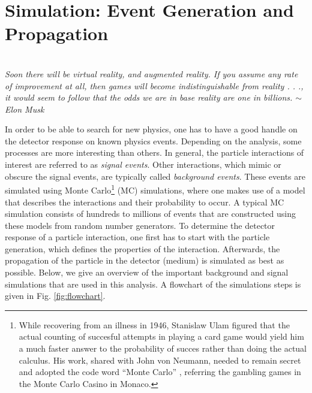 \chapter{Simulation: Event Generation and Propagation}
\label{ch:simulation}
\begin{flushright}
\textit{\\Soon there will be virtual reality, and augmented reality. If you assume any rate of improvement at all, then games will become indistinguishable from reality . . ., it would seem to follow that the odds we are in base reality are one in billions. $\sim$ Elon Musk\\}
\end{flushright}
In order to be able to search for new physics, one has to have a good handle on the detector response on known physics events. Depending on the analysis, some processes are more interesting than others. In general, the particle interactions of interest are referred to as \textit{signal events}. Other interactions, which mimic or obscure the signal events, are typically called \textit{background events}. These events are simulated using Monte Carlo\footnote{While recovering from an illness in 1946, Stanislaw Ulam figured that the actual counting of succesful attempts in playing a card game would yield him a much faster answer to the probability of succes rather than doing the actual calculus. His work, shared with John von Neumann, needed to remain secret and adopted the code word ``Monte Carlo'' , referring the gambling games in the Monte Carlo Casino in Monaco.} (MC) simulations, where one makes use of a model that describes the interactions and their probability to occur. A typical MC simulation consists of hundreds to millions of events that are constructed using these models from random number generators. To determine the detector response of a particle interaction, one first has to start with the particle generation, which defines the properties of the interaction. Afterwards, the propagation of the particle in the detector (medium) is simulated as best as possible. Below, we give an overview of the important background and signal simulations that are used in this analysis. A flowchart of the simulations steps is given in Fig. \ref{fig:flowchart}.


